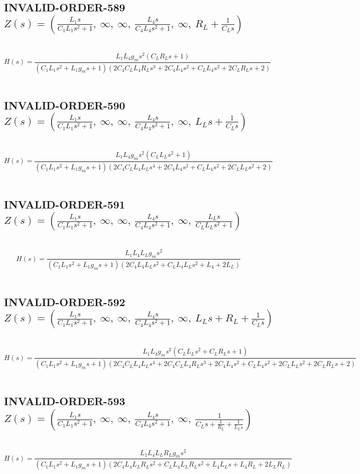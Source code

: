 \documentclass{article}
\begin{document}
\subsection{INVALID-ORDER-589 $Z(s) = \left( \frac{L_{1} s}{C_{1} L_{1} s^{2} + 1}, \  \infty, \  \infty, \  \frac{L_{4} s}{C_{4} L_{4} s^{2} + 1}, \  \infty, \  R_{L} + \frac{1}{C_{L} s}\right)$ } \ 
\textbf{\[H(s) = \frac{L_{1} L_{4} g_{m} s^{2} \left(C_{L} R_{L} s + 1\right)}{\left(C_{1} L_{1} s^{2} + L_{1} g_{m} s + 1\right) \left(2 C_{4} C_{L} L_{4} R_{L} s^{3} + 2 C_{4} L_{4} s^{2} + C_{L} L_{4} s^{2} + 2 C_{L} R_{L} s + 2\right)}\] } \ 
\subsection{INVALID-ORDER-590 $Z(s) = \left( \frac{L_{1} s}{C_{1} L_{1} s^{2} + 1}, \  \infty, \  \infty, \  \frac{L_{4} s}{C_{4} L_{4} s^{2} + 1}, \  \infty, \  L_{L} s + \frac{1}{C_{L} s}\right)$ } \ 
\textbf{\[H(s) = \frac{L_{1} L_{4} g_{m} s^{2} \left(C_{L} L_{L} s^{2} + 1\right)}{\left(C_{1} L_{1} s^{2} + L_{1} g_{m} s + 1\right) \left(2 C_{4} C_{L} L_{4} L_{L} s^{4} + 2 C_{4} L_{4} s^{2} + C_{L} L_{4} s^{2} + 2 C_{L} L_{L} s^{2} + 2\right)}\] } \ 
\subsection{INVALID-ORDER-591 $Z(s) = \left( \frac{L_{1} s}{C_{1} L_{1} s^{2} + 1}, \  \infty, \  \infty, \  \frac{L_{4} s}{C_{4} L_{4} s^{2} + 1}, \  \infty, \  \frac{L_{L} s}{C_{L} L_{L} s^{2} + 1}\right)$ } \ 
\textbf{\[H(s) = \frac{L_{1} L_{4} L_{L} g_{m} s^{2}}{\left(C_{1} L_{1} s^{2} + L_{1} g_{m} s + 1\right) \left(2 C_{4} L_{4} L_{L} s^{2} + C_{L} L_{4} L_{L} s^{2} + L_{4} + 2 L_{L}\right)}\] } \ 
\subsection{INVALID-ORDER-592 $Z(s) = \left( \frac{L_{1} s}{C_{1} L_{1} s^{2} + 1}, \  \infty, \  \infty, \  \frac{L_{4} s}{C_{4} L_{4} s^{2} + 1}, \  \infty, \  L_{L} s + R_{L} + \frac{1}{C_{L} s}\right)$ } \ 
\textbf{\[H(s) = \frac{L_{1} L_{4} g_{m} s^{2} \left(C_{L} L_{L} s^{2} + C_{L} R_{L} s + 1\right)}{\left(C_{1} L_{1} s^{2} + L_{1} g_{m} s + 1\right) \left(2 C_{4} C_{L} L_{4} L_{L} s^{4} + 2 C_{4} C_{L} L_{4} R_{L} s^{3} + 2 C_{4} L_{4} s^{2} + C_{L} L_{4} s^{2} + 2 C_{L} L_{L} s^{2} + 2 C_{L} R_{L} s + 2\right)}\] } \ 
\subsection{INVALID-ORDER-593 $Z(s) = \left( \frac{L_{1} s}{C_{1} L_{1} s^{2} + 1}, \  \infty, \  \infty, \  \frac{L_{4} s}{C_{4} L_{4} s^{2} + 1}, \  \infty, \  \frac{1}{C_{L} s + \frac{1}{R_{L}} + \frac{1}{L_{L} s}}\right)$ } \ 
\textbf{\[H(s) = \frac{L_{1} L_{4} L_{L} R_{L} g_{m} s^{2}}{\left(C_{1} L_{1} s^{2} + L_{1} g_{m} s + 1\right) \left(2 C_{4} L_{4} L_{L} R_{L} s^{2} + C_{L} L_{4} L_{L} R_{L} s^{2} + L_{4} L_{L} s + L_{4} R_{L} + 2 L_{L} R_{L}\right)}\] } \ 
\end{document}
